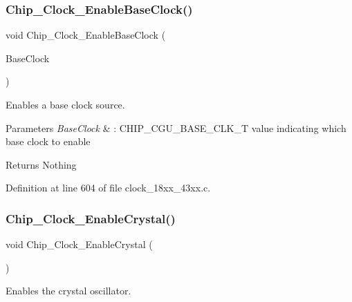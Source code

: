 \subsubsection{\texorpdfstring{Chip\+\_\+\+Clock\+\_\+\+Enable\+Base\+Clock()}{Chip\_Clock\_EnableBaseClock()}}
{\footnotesize\ttfamily void Chip\+\_\+\+Clock\+\_\+\+Enable\+Base\+Clock (\begin{DoxyParamCaption}\item[{\hyperlink{chip__clocks_8h_a31e266dd83cc66eb866d8d051ffd1d45}{C\+H\+I\+P\+\_\+\+C\+G\+U\+\_\+\+B\+A\+S\+E\+\_\+\+C\+L\+K\+\_\+T}}]{Base\+Clock }\end{DoxyParamCaption})}



Enables a base clock source. 


\begin{DoxyParams}{Parameters}
{\em Base\+Clock} & \+: C\+H\+I\+P\+\_\+\+C\+G\+U\+\_\+\+B\+A\+S\+E\+\_\+\+C\+L\+K\+\_\+T value indicating which base clock to enable \\
\hline
\end{DoxyParams}
\begin{DoxyReturn}{Returns}
Nothing 
\end{DoxyReturn}


Definition at line 604 of file clock\+\_\+18xx\+\_\+43xx.\+c.

\mbox{\label{group___c_l_o_c_k__18_x_x__43_x_x_gaa74040cd24046b7e09cbb2c1cf6e6c0d}} 
\subsubsection{\texorpdfstring{Chip\+\_\+\+Clock\+\_\+\+Enable\+Crystal()}{Chip\_Clock\_EnableCrystal()}}
{\footnotesize\ttfamily void Chip\+\_\+\+Clock\+\_\+\+Enable\+Crystal (\begin{DoxyParamCaption}\item[{void}]{ }\end{DoxyParamCaption})}



Enables the crystal oscillator. 

